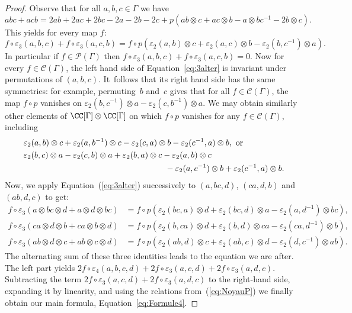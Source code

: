 \begin{proof}
Observe that for all $a,b,c\in\Gamma$ we have
\[ abc+acb=2ab+2ac+2bc-2a-2b-2c+
p(ab\otimes c+ac\otimes b-a\otimes bc^{-1}-2b\otimes c). \]
This yields for every map $f$:
\begin{equation}\label{eq:3alter}
f\circ \varepsilon_3(a,b,c)+f\circ \varepsilon_3(a,c,b)
=f\circ p(\varepsilon_2(a,b)\otimes c+\varepsilon_2(a,c)\otimes b
-\varepsilon_2(b,c^{-1})\otimes a).
\end{equation}
In particular if $f\in \mathcal{P}(\Gamma)$ then
$f\circ\varepsilon_3(a,b,c)+f\circ \varepsilon_3(a,c,b)=0$.
Now for every $f\in\mathcal{C}(\Gamma)$, the left hand side of
Equation~\eqref{eq:3alter} is invariant under permutations of $(a,b,c)$.
It~follows that its right hand side has the same symmetries: for example,
permuting~$b$ and~$c$ gives that for all
$f\in\mathcal{C}(\Gamma)$, the map $f\circ p$ vanishes on
$\varepsilon_2(b,c^{-1})\otimes a - \varepsilon_2(c,b^{-1})\otimes a$.
We may obtain similarly other
elements of $\CC[\Gamma]\otimes\CC[\Gamma]$ on which $f\circ p$ vanishes
for any $f\in\mathcal{C}(\Gamma)$, including
\begin{equation}\label{eq:NoyauP}
\begin{split}
&\varepsilon_2(a,b)\otimes c + \varepsilon_2(a, b^{-1})\otimes c
- \varepsilon_2(c, a)\otimes b - \varepsilon_2(c^{-1}, a)\otimes b,
\text{ or}\\
&\varepsilon_2(b, c)\otimes a-\varepsilon_2(c, b)\otimes a
+\varepsilon_2(b, a)\otimes c -\varepsilon_2(a, b)\otimes c\\
&\hspace*{6cm}-\varepsilon_2(a, c^{-1})\otimes b + \varepsilon_2(c^{-1}, a)\otimes b.
\end{split}
\end{equation}
Now, we apply Equation~(\ref{eq:3alter}) successively to $(a,bc,d)$,
$(ca,d,b)$ and $(ab,d,c)$ to get:
\begin{align*}
f\circ \varepsilon_3(a\otimes bc\otimes d+a\otimes d\otimes bc) & =
f\circ p(\varepsilon_2(bc,a)\otimes d+\varepsilon_2(bc,d)\otimes a
-\varepsilon_2(a,d^{-1})\otimes bc), \\
f\circ\varepsilon_3(ca\otimes d\otimes b+ca\otimes b\otimes d) & =
f\circ p(\varepsilon_2(b,ca)\otimes d+\varepsilon_2(b,d)\otimes ca
-\varepsilon_2(ca,d^{-1})\otimes b), \\
f\circ\varepsilon_3(ab\otimes d\otimes c+ab\otimes c\otimes d) & =
f\circ p(\varepsilon_2(ab, d)\otimes c+\varepsilon_2(ab,c)\otimes d
-\varepsilon_2(d,c^{-1})\otimes ab).
\end{align*}
The alternating sum of these three identities leads to the equation we
are after. The left part yields
$2f\circ\varepsilon_4(a,b,c,d)
+2f\circ\varepsilon_3(a,c,d)+2f\circ\varepsilon_3(a,d,c)$.
Subtracting the term
$2f\circ\varepsilon_3(a,c,d)+2f\circ\varepsilon_3(a,d,c)$
to the right-hand side, expanding it by linearity, and using the
relations from~(\ref{eq:NoyauP}) we finally obtain our main formula,
Equation~\eqref{eq:Formule4}.


\end{proof}
